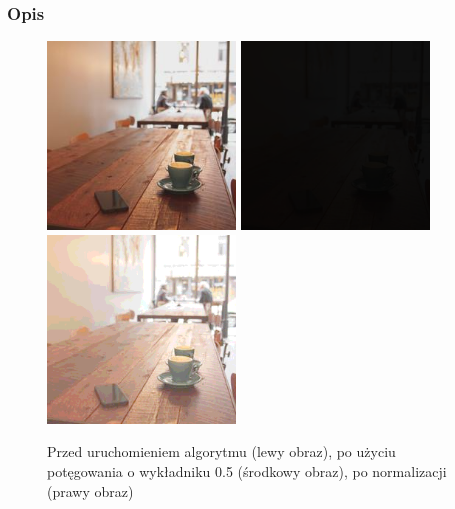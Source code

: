 \documentclass[a4paper,12pt]{book}
\begin{document}
\subsubsection*{Opis}
\begin{figure}[H]
	\caption{Przed uruchomieniem algorytmu (lewy obraz), po użyciu potęgowania o wykładniku 0.5 (środkowy obraz), po normalizacji (prawy obraz)}
	\includegraphics[width=5cm, height=5cm]{coffee-unmodified.jpg}
	\includegraphics[width=5cm, height=5cm]{3-4/power-color-coffee-5.png}
	\includegraphics[width=5cm, height=5cm]{3-4/power-color-coffee-5-norm.png}
\end{figure}
\end{document}
